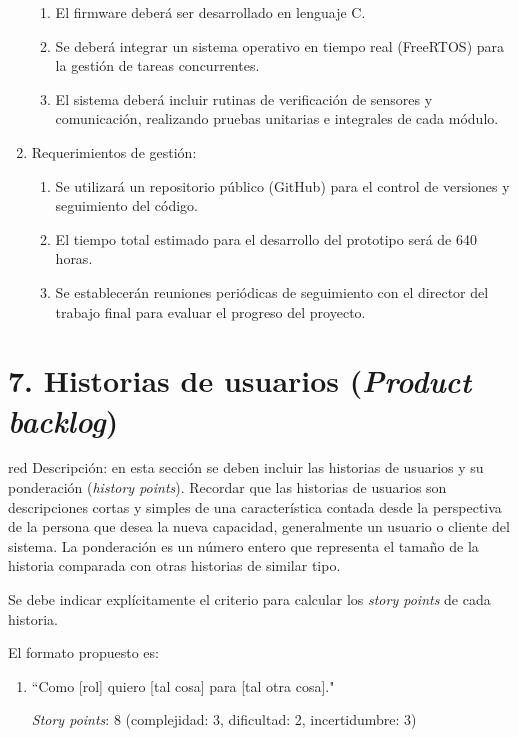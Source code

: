 \documentclass[
11pt, %
]{charter}
\newcommand{\horaTrabajo}{640}
\begin{document}
\begin{enumerate}
\begin{enumerate}
			\item El firmware deberá ser desarrollado en lenguaje C.
			\item Se deberá integrar un sistema operativo en tiempo real (FreeRTOS) para la gestión de tareas concurrentes.
			\item El sistema deberá incluir rutinas de verificación de sensores y comunicación, realizando pruebas unitarias e integrales de cada módulo.
		\end{enumerate}
	\item Requerimientos de gestión:
		\begin{enumerate}
			\item Se utilizará un repositorio público (GitHub) para el control de versiones y seguimiento del código.
			\item El tiempo total estimado para el desarrollo del prototipo será de {\horaTrabajo} horas.
			\item Se establecerán reuniones periódicas de seguimiento con el director del trabajo final para evaluar el progreso del proyecto.
		\end{enumerate}
\end{enumerate}





\section{7. Historias de usuarios (\textit{Product backlog})}
\label{sec:backlog}

\begin{consigna}{red}
Descripción: en esta sección se deben incluir las historias de usuarios y su ponderación (\textit{history points}). Recordar que las historias de usuarios son descripciones cortas y simples de una característica contada desde la perspectiva de la persona que desea la nueva capacidad, generalmente un usuario o cliente del sistema. La ponderación es un número entero que representa el tamaño de la historia comparada con otras historias de similar tipo.

Se debe indicar explícitamente el criterio para calcular los \textit{story points} de cada historia.

El formato propuesto es: 
\begin{enumerate}
\item ``Como [rol] quiero [tal cosa] para [tal otra cosa]."

\textit{Story points}: 8 (complejidad: 3, dificultad: 2, incertidumbre: 3)
\end{enumerate}
\end{consigna}
\end{document}
